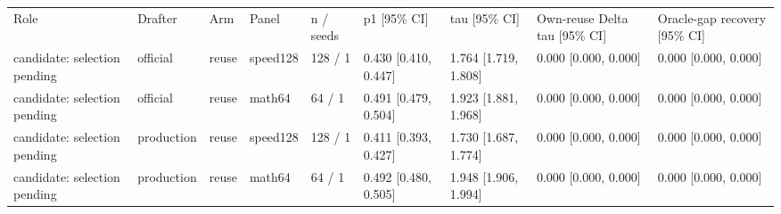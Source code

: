 \begin{tabular}{lllllllll}
Role & Drafter & Arm & Panel & n / seeds & p1 [95\% CI] & tau [95\% CI] & Own-reuse Delta tau [95\% CI] & Oracle-gap recovery [95\% CI] \\
candidate: selection pending & official & reuse & speed128 & 128 / 1 & 0.430 [0.410, 0.447] & 1.764 [1.719, 1.808] & 0.000 [0.000, 0.000] & 0.000 [0.000, 0.000] \\
candidate: selection pending & official & reuse & math64 & 64 / 1 & 0.491 [0.479, 0.504] & 1.923 [1.881, 1.968] & 0.000 [0.000, 0.000] & 0.000 [0.000, 0.000] \\
candidate: selection pending & production & reuse & speed128 & 128 / 1 & 0.411 [0.393, 0.427] & 1.730 [1.687, 1.774] & 0.000 [0.000, 0.000] & 0.000 [0.000, 0.000] \\
candidate: selection pending & production & reuse & math64 & 64 / 1 & 0.492 [0.480, 0.505] & 1.948 [1.906, 1.994] & 0.000 [0.000, 0.000] & 0.000 [0.000, 0.000] \\
\end{tabular}
